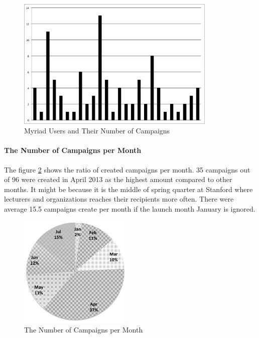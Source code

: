 \begin{figure}[htbp]
	\centering
	\includegraphics[width=0.85\textwidth]{imgs/ChartUsersCampaigns.png}
	\caption[Myriad Users and Their Number of Campaigns]{Myriad Users and Their Number of Campaigns}
	\label{fig:ChartUsersCampaigns}
\end{figure}

\paragraph{The Number of Campaigns per Month} The figure \ref{fig:ChartCampaignsMonths} shows the ratio of created campaigns per month. 35 campaigns out of 96 were created in April 2013 as the highest amount compared to other months. It might be because it is the middle of spring quarter at Stanford where lecturers and organizations reaches their recipients more often. There were average 15.5 campaigns create per month if the launch month January is ignored.

\begin{figure}[htbp]
	\centering
	\includegraphics[width=0.48\textwidth]{imgs/ChartCampaignsMonths.png}
	\caption[The Number of Campaigns per Month]{The Number of Campaigns per Month}
	\label{fig:ChartCampaignsMonths}
\end{figure}

